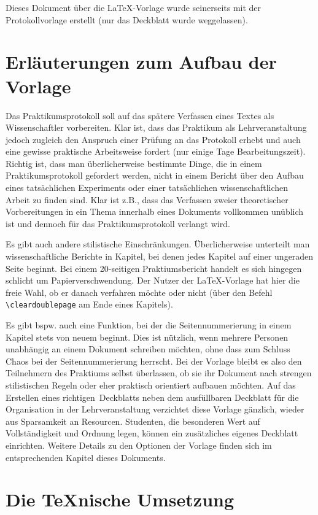 Dieses Dokument über die LaTeX-Vorlage wurde seinerseits mit der Protokollvorlage erstellt (nur das Deckblatt wurde weggelassen).

\section{Erläuterungen zum Aufbau der Vorlage}
Das Praktikumsprotokoll soll auf das spätere Verfassen eines Textes als Wissenschaftler vorbereiten. Klar ist, dass das Praktikum als Lehrveranstaltung jedoch zugleich den Anspruch einer Prüfung an das Protokoll erhebt und auch eine gewisse praktische Arbeitsweise fordert (nur einige Tage Bearbeitungszeit). Richtig ist, dass man überlicherweise bestimmte Dinge, die in einem Praktikumsprotokoll gefordert werden, nicht in einem Bericht über den Aufbau eines tatsächlichen Experiments oder einer tatsächlichen wissenschaftlichen Arbeit zu finden sind. Klar ist z.B., dass das Verfassen zweier theoretischer Vorbereitungen in ein Thema innerhalb eines Dokuments vollkommen unüblich ist und dennoch für das Praktikumsprotokoll verlangt wird.

Es gibt auch andere stilistische Einschränkungen. Überlicherweise unterteilt man wissenschaftliche Berichte in Kapitel, bei denen jedes Kapitel auf einer ungeraden Seite beginnt. Bei einem 20-seitigen Praktiumsbericht handelt es sich hingegen schlicht um Papierverschwendung. Der Nutzer der LaTeX-Vorlage hat hier die freie Wahl, ob er danach verfahren möchte oder nicht (über den Befehl \verb|\cleardoublepage| am Ende eines Kapitels).

Es gibt bspw. auch eine Funktion, bei der die Seitennummerierung in einem Kapitel stets von neuem beginnt. Dies ist nützlich, wenn mehrere Personen unabhängig an einem Dokument schreiben möchten, ohne dass zum Schluss Chaos bei der Seitennummerierung herrscht. Bei der Vorlage bleibt es also den Teilnehmern des Praktiums selbst überlassen, ob sie ihr Dokument nach strengen stilistischen Regeln oder eher praktisch orientiert aufbauen möchten. Auf das Erstellen eines \glqq richtigen\grqq\ Deckblatts neben dem ausfüllbaren Deckblatt für die Organisation in der Lehrveranstaltung verzichtet diese Vorlage gänzlich, wieder aus Sparsamkeit an Resourcen. Studenten, die besonderen Wert auf Vollständigkeit und Ordnung legen, können ein zusätzliches eigenes Deckblatt einrichten. Weitere Details zu den Optionen der Vorlage finden sich im entsprechenden Kapitel dieses Dokuments.



\section{Die TeXnische Umsetzung}
